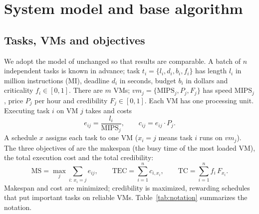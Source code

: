 \documentclass[pdflatex,sn-basic]{sn-jnl}
\theoremstyle{thmstyleone}%
\theoremstyle{thmstyletwo}%
\theoremstyle{thmstylethree}%
\begin{document}
\section{System model and base algorithm}\label{sec3}
\subsection{Tasks, VMs and objectives}\label{sec3.1}
We adopt the model of \citet{ouyang2025} unchanged so that results are comparable. A batch of $n$ independent tasks is known in advance; task $t_i=\{l_i,d_i,b_i,f_i\}$ has length $l_i$ in million instructions (MI), deadline $d_i$ in seconds, budget $b_i$ in dollars and criticality $f_i\in[0,1]$. There are $m$ VMs; $vm_j=\{\mathrm{MIPS}_j,P_j,F_j\}$ has speed $\mathrm{MIPS}_j$, price $P_j$ per hour and credibility $F_j\in[0,1]$. Each VM has one processing unit. Executing task $i$ on VM $j$ takes and costs
\begin{equation}
e_{ij}=\frac{l_i}{\mathrm{MIPS}_j},\qquad c_{ij}=e_{ij}\cdot P_j .
\label{eq:eij}
\end{equation}
A schedule $x$ assigns each task to one VM ($x_i=j$ means task $i$ runs on $vm_j$). The three objectives of \citet{ouyang2025} are the makespan (the busy time of the most loaded VM), the total execution cost and the total credibility:
\begin{equation}
\mathrm{MS}=\max_{j}\sum_{i:\,x_i=j}e_{ij},\qquad
\mathrm{TEC}=\sum_{i=1}^{n}c_{i,x_i},\qquad
\mathrm{TC}=\sum_{i=1}^{n}f_i\,F_{x_i}.
\label{eq:obj}
\end{equation}
Makespan and cost are minimized; credibility is maximized, rewarding schedules that put important tasks on reliable VMs. Table~\ref{tab:notation} summarizes the notation.
\end{document}
